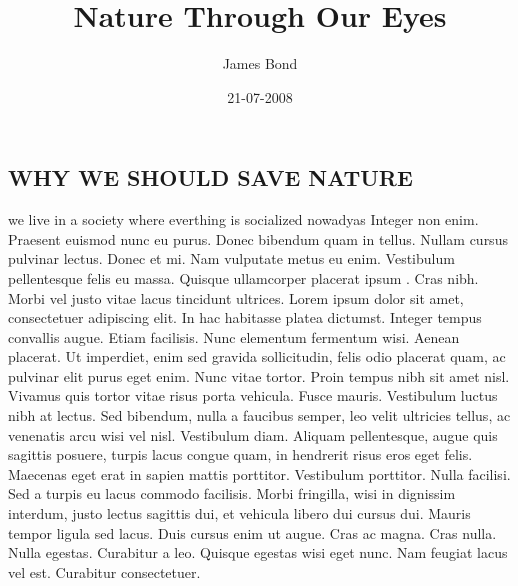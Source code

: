 \documentclass[12pt,a4paper]{article}
\title{Nature Through Our Eyes}
\author{James Bond}
\date{21-07-2008}
\begin{document}
\maketitle
\begin{center}
\section*{WHY WE SHOULD SAVE NATURE}
\end{center}
we live in a society where everthing is socialized nowadyas \cite {ref1}
Integer non enim. Praesent euismod nunc eu purus. Donec bibendum quam
in tellus. Nullam cursus pulvinar lectus. Donec et mi. Nam vulputate metus
eu enim. Vestibulum pellentesque felis eu massa.\cite{ref2}
Quisque ullamcorper placerat ipsum \cite {ref3}. Cras nibh. Morbi vel justo vitae
lacus tincidunt ultrices. Lorem ipsum dolor sit amet, consectetuer adipiscing
elit. In hac habitasse platea dictumst. Integer tempus convallis augue. Etiam
facilisis. Nunc elementum fermentum wisi. Aenean placerat. Ut imperdiet,
enim sed gravida sollicitudin, felis odio placerat quam, ac pulvinar elit purus
eget enim. Nunc vitae tortor. Proin tempus nibh sit amet nisl. Vivamus
quis tortor vitae risus porta vehicula\cite {ref4}.
Fusce mauris. Vestibulum luctus nibh at lectus. Sed bibendum, nulla
a faucibus semper, leo velit ultricies tellus, ac venenatis arcu wisi vel nisl.
Vestibulum diam. Aliquam pellentesque, augue quis sagittis posuere, turpis
lacus congue quam, in hendrerit risus eros eget felis\cite {ref5}. Maecenas eget erat in
sapien mattis porttitor. Vestibulum porttitor. Nulla facilisi. Sed a turpis
eu lacus commodo facilisis. Morbi fringilla, wisi in dignissim interdum, justo
lectus sagittis dui, et vehicula libero dui cursus dui. Mauris tempor ligula
sed lacus. Duis cursus enim ut augue. Cras ac magna. Cras nulla. Nulla
egestas. Curabitur a leo. Quisque egestas wisi eget nunc. Nam feugiat lacus
vel est. Curabitur consectetuer\cite{ref6}.


\end{document}
